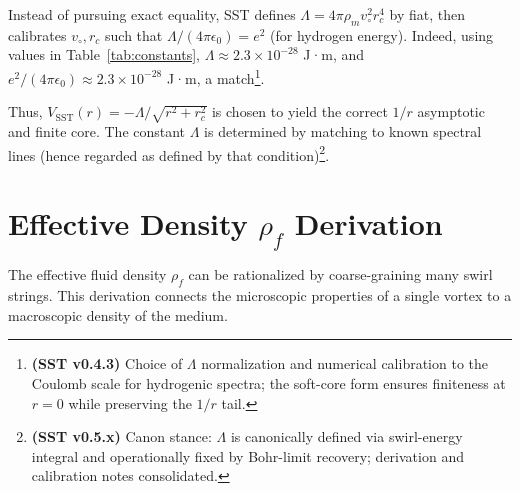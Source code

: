 \documentclass[reprint,aps,onecolumn,nofootinbib]{revtex4-2}
\begin{document}
    Instead of pursuing exact equality, SST defines $\Lambda = 4\pi\rho_m v_{\circ}^2 r_c^4$ by fiat, then calibrates $v_{\circ}, r_c$ such that $\Lambda/(4\pi\epsilon_0) = e^2$ (for hydrogen energy). Indeed, using values in Table~\ref{tab:constants}, $\Lambda \approx 2.3\times 10^{-28}$ J·m, and $e^2/(4\pi\epsilon_0)\approx 2.3\times10^{-28}$ J·m, a match\footnote{\textbf{(SST v0.4.3)} Choice of $\Lambda$ normalization and numerical calibration to the Coulomb scale for hydrogenic spectra; the soft-core form ensures finiteness at $r=0$ while preserving the $1/r$ tail.}.

    Thus, $V_{\text{SST}}(r) = -\Lambda/\sqrt{r^2+r_c^2}$ is chosen to yield the correct $1/r$ asymptotic and finite core. The constant $\Lambda$ is determined by matching to known spectral lines (hence regarded as defined by that condition)\footnote{\textbf{(SST v0.5.x)} Canon stance: $\Lambda$ is canonically defined via swirl-energy integral and operationally fixed by Bohr-limit recovery; derivation and calibration notes consolidated.}.

\section{Effective Density $\rho_f$ Derivation}
    The effective fluid density $\rho_f$ can be rationalized by coarse-graining many swirl strings. This derivation connects the microscopic properties of a single vortex to a macroscopic density of the medium.
\end{document}
